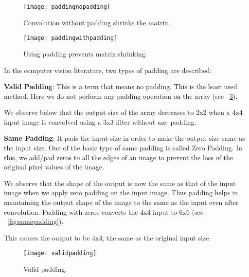 	\begin{figure}[htb]
		\centering
		\texttt{[image: paddingnopadding]}
		\caption[Convolution without padding shrinks the matrix]{Convolution without padding shrinks the matrix.}
		\label{fig:paddingnopadding}
	\end{figure}
	\begin{figure}[htb]
		\centering
		\texttt{[image: paddingwithpadding]}
		\caption[Using padding prevents matrix shrinking]{Using padding prevents matrix shrinking.}
		\label{fig:paddingwithpadding}
	\end{figure}

In the computer vision literature, two types of padding are described:
	\begin{bulletedlist}
		\item {\bfseries Valid Padding}: This is a term that means no padding.  This is the least used method.  Here we do not perform any padding operation on the array (see \figurename~\ref{fig:validpadding}).
		\begin{bulletedlist}
			\item We observe below that the output size of the array decreases to 2x2 when a 4x4 input image is convolved using a 3x3 filter without any padding.
		\end{bulletedlist}
		\item {\bfseries Same Padding}: It pads the input size in-order to make the output size same as the input size.  One of the basic type of same padding is called Zero Padding. In this, we add/pad zeros to all the edges of an image to prevent the loss of the original pixel values of the image.
		\begin{bulletedlist}
			\item We observe that the shape of the output is now the same as that of the input image when we apply zero padding on the input image. Thus padding helps in maintaining the output shape of the image to the same as the input even after convolution.
Padding with zeros converts the 4x4 input to 6x6 (see \figurename~\ref{fig:samepadding}).
			\item This causes the output to be 4x4, the same as the original input size.
		\end{bulletedlist}
	\end{bulletedlist}

	\begin{figure}[htb]
		\centering
		\texttt{[image: validpadding]}
		\caption[Valid padding]{Valid padding.}
		\label{fig:validpadding}
	\end{figure}

